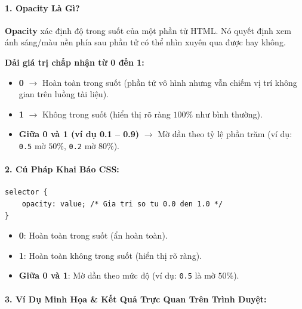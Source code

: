\documentclass[11pt,oneside]{book}
\newcommand{\codeinline}[1]{\textcolor{accentOrange}{\texttt{#1}}}
\begin{document}
\paragraph{1. Opacity Là Gì?}

\begin{conceptBox}
\textbf{Opacity} xác định độ trong suốt của một phần tử HTML. Nó quyết định xem ánh sáng/màu nền phía sau phần tử có thể nhìn xuyên qua được hay không.
\par\vspace{4pt}
\textbf{Dải giá trị chấp nhận từ 0 đến 1:}
\begin{itemize}[leftmargin=1.5em, itemsep=3pt, parsep=0pt]
    \item \textbf{0} $\rightarrow$ Hoàn toàn trong suốt (phần tử vô hình nhưng vẫn chiếm vị trí không gian trên luồng tài liệu).
    \item \textbf{1} $\rightarrow$ Không trong suốt (hiển thị rõ ràng $100\%$ như bình thường).
    \item \textbf{Giữa 0 và 1 (ví dụ 0.1 -- 0.9)} $\rightarrow$ Mờ dần theo tỷ lệ phần trăm (ví dụ: \codeinline{0.5} mờ $50\%$, \codeinline{0.2} mờ $80\%$).
\end{itemize}
\end{conceptBox}

\paragraph{2. Cú Pháp Khai Báo CSS:}

\begin{codeWindow}
\begin{lstlisting}[language=CSS3]
selector {
    opacity: value; /* Gia tri so tu 0.0 den 1.0 */
}
\end{lstlisting}
\end{codeWindow}

\begin{itemize}[leftmargin=1.5em, itemsep=2pt, parsep=0pt]
    \item \textbf{0}: Hoàn toàn trong suốt (ẩn hoàn toàn).
    \item \textbf{1}: Hoàn toàn không trong suốt (hiển thị rõ ràng).
    \item \textbf{Giữa 0 và 1}: Mờ dần theo mức độ (ví dụ: \codeinline{0.5} là mờ $50\%$).
\end{itemize}

\paragraph{3. Ví Dụ Minh Họa \& Kết Quả Trực Quan Trên Trình Duyệt:}
\end{document}
